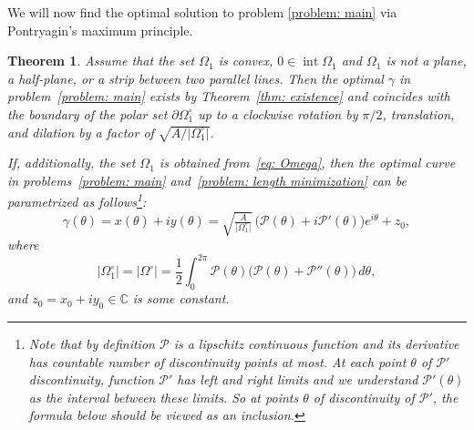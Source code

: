 \documentclass[a4paper,12pt]{article}
\newcommand {\PPP}{\mathcal{P}}
\newtheorem{theorem}{Theorem}
\theoremstyle{remark}
\theoremstyle{definition}
\begin{document}
We will now find the optimal solution to problem \eqref{problem: main} via Pontryagin's maximum principle.

\begin{theorem}
	\label{thm: main}
	Assume that the set $\Omega_1$ is convex, $0\in\operatorname{int}\Omega_1$ and $\Omega_1$ is not a plane, a half-plane, or a strip between two parallel lines. Then the optimal $\gamma$ in problem~\eqref{problem: main} exists by Theorem~\ref{thm: existence} and coincides with the boundary of the polar set $\partial\Omega_1^\circ$ up to a clockwise rotation by $\pi/2$, translation, and dilation by a factor of $\sqrt{A/|\Omega_1^\circ|}$.

    If, additionally, the set $\Omega_1$ is obtained from~\eqref{eq: Omega}, then the optimal curve in problems~\eqref{problem: main} and~\eqref{problem: length minimization} can be parametrized as follows\footnote{Note that by definition $\PPP$ is a lipschitz continuous function and its derivative has countable number of discontinuity points at most. At each point $\theta$ of $\PPP'$ discontinuity, function $\PPP'$ has left and right limits and we understand $\PPP'(\theta)$ as the interval between these limits. So at points $\theta$ of discontinuity of $\PPP'$, the formula below should be viewed as an inclusion.}:
	$$
	\gamma(\theta)=x(\theta) + iy(\theta) = \sqrt{\tfrac{A}{|\Omega_1^\circ|}}\, \big(\PPP(\theta)+i\PPP'(\theta)\big)e^{i\theta} + z_0,
	$$
	where
	$$
	|\Omega_1^\circ| = |\Omega^\circ| = \frac12\int_0^{2\pi} \PPP(\theta)\big(\PPP(\theta)+\PPP''(\theta)\big)\,d\theta,
	$$
	and $z_0=x_0+iy_0\in\mathbb{C}$ is some constant.
\end{theorem}
\end{document}
